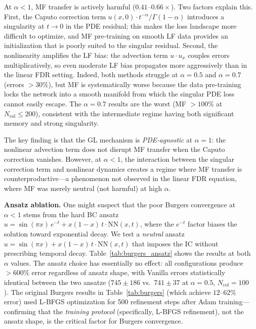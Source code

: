 \documentclass[11pt]{article}
\newcommand{\Ncol}{N_{\mathrm{col}}}
\begin{document}
At $\alpha < 1$, MF transfer is actively harmful ($0.41$--$0.66\times$). Two factors explain this. First, the Caputo correction term $u(x,0) \cdot t^{-\alpha}/\Gamma(1-\alpha)$ introduces a singularity at $t \to 0$ in the PDE residual; this makes the loss landscape more difficult to optimize, and MF pre-training on smooth LF data provides an initialization that is poorly suited to the singular residual. Second, the nonlinearity amplifies the LF bias: the advection term $u \cdot u_x$ couples errors multiplicatively, so even moderate LF bias propagates more aggressively than in the linear FDR setting. Indeed, both methods struggle at $\alpha = 0.5$ and $\alpha = 0.7$ (errors $> 30\%$), but MF is systematically worse because the data pre-training locks the network into a smooth manifold from which the singular PDE loss cannot easily escape. The $\alpha = 0.7$ results are the worst (MF $> 100\%$ at $\Ncol \leq 200$), consistent with the intermediate regime having both significant memory and strong singularity.

The key finding is that the GL mechanism is \emph{PDE-agnostic} at $\alpha = 1$: the nonlinear advection term does not disrupt MF transfer when the Caputo correction vanishes. However, at $\alpha < 1$, the interaction between the singular correction term and nonlinear dynamics creates a regime where MF transfer is counterproductive---a phenomenon not observed in the linear FDR equation, where MF was merely neutral (not harmful) at high $\alpha$.

\textbf{Ansatz ablation.} One might suspect that the poor Burgers convergence at $\alpha < 1$ stems from the hard BC ansatz $u = \sin(\pi x)\,e^{-t} + x(1-x)\,t\cdot\mathrm{NN}(x,t)$, where the $e^{-t}$ factor biases the solution toward exponential decay. We test a \emph{neutral} ansatz $u = \sin(\pi x) + x(1-x)\,t\cdot\mathrm{NN}(x,t)$ that imposes the IC without prescribing temporal decay. Table~\ref{tab:burgers_ansatz} shows the results at both $\alpha$ values. The ansatz choice has essentially no effect: all configurations produce $>600\%$ error regardless of ansatz shape, with Vanilla errors statistically identical between the two ansatze ($745 \pm 186$ vs.\ $741 \pm 37$ at $\alpha = 0.5$, $\Ncol = 100$). The original Burgers results in Table~\ref{tab:burgers} (which achieve $12$--$62\%$ error) used L-BFGS optimization for 500 refinement steps after Adam training---confirming that the \emph{training protocol} (specifically, L-BFGS refinement), not the ansatz shape, is the critical factor for Burgers convergence.
\end{document}
